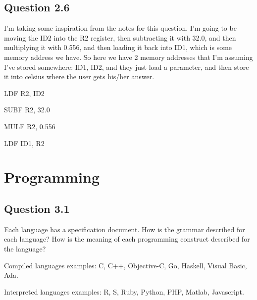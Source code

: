 \documentclass[11pt, oneside]{article}
\begin{document}
\subsection{Question 2.6}
\par I'm taking some inspiration from the notes for this question. I'm going to be moving the ID2 into the R2 register, then subtracting it with 32.0, and then multiplying it with 0.556, and then loading it back into ID1, which is some memory address we have. So here we have 2 memory addresses that I'm assuming I've stored somewhere: ID1, ID2, and they just load a parameter, and then store it into celsius where the user gets his/her answer.
\par LDF R2, ID2
\par SUBF R2, 32.0
\par MULF R2, 0.556
\par LDF ID1, R2

\section{Programming}
\subsection{Question 3.1}
\par Each language has a specification document. How is the grammar described for each language? How is the meaning of each programming construct described for the language?
\par Compiled languages examples: C, C++, Objective-C, Go, Haskell, Visual Basic, Ada.
\par Interpreted languages examples: R, S, Ruby, Python, PHP, Matlab, Javascript.
\end{document}
